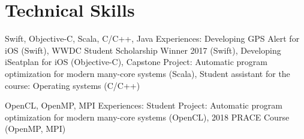 \documentclass[11pt,a4paper,sans]{moderncv}        %
\begin{document}





\section{Technical Skills}
					{Swift, Objective-C, Scala, C/C++, Java}{}{}{}
					{Experiences:
					 Developing GPS Alert for iOS (Swift), 
					 WWDC Student Scholarship Winner 2017 (Swift), 
					 Developing iSeatplan for iOS (Objective-C), 
					 Capstone Project: Automatic program optimization for modern many-core systems (Scala), 
					 Student assistant for the course: Operating systems (C/C++)
					}
                    

					{OpenCL, OpenMP, MPI}{}{}{}
					{Experiences:
					 Student Project: Automatic program optimization for modern many-core systems (OpenCL),
					 2018 PRACE Course (OpenMP, MPI)
					}



    
%
\end{document}
